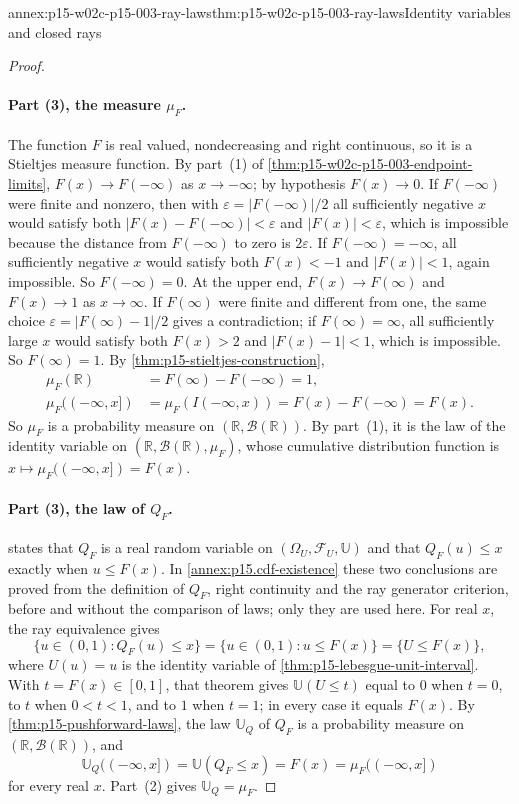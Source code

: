 \begin{annexitem}{annex:p15-w02c-p15-003-ray-laws}{thm:p15-w02c-p15-003-ray-laws}{Identity variables and closed rays}
\begin{proof}
\paragraph{Part (3), the measure \(\mu_F\).}
The function \(F\) is real valued, nondecreasing and right continuous,
so it is a Stieltjes measure function. By part~(1) of
\cref{thm:p15-w02c-p15-003-endpoint-limits}, \(F(x)\to F(-\infty)\) as
\(x\to-\infty\); by hypothesis \(F(x)\to0\). If \(F(-\infty)\) were
finite and nonzero, then with \(\varepsilon=|F(-\infty)|/2\) all
sufficiently negative \(x\) would satisfy both
\(|F(x)-F(-\infty)|<\varepsilon\) and \(|F(x)|<\varepsilon\), which
is impossible because the distance from \(F(-\infty)\) to zero is
\(2\varepsilon\). If \(F(-\infty)=-\infty\), all sufficiently negative
\(x\) would satisfy both \(F(x)<-1\) and \(|F(x)|<1\), again
impossible. So \(F(-\infty)=0\). At the upper end, \(F(x)\to F(\infty)\)
and \(F(x)\to1\) as \(x\to\infty\). If \(F(\infty)\) were finite and
different from one, the same choice
\(\varepsilon=|F(\infty)-1|/2\) gives a contradiction; if
\(F(\infty)=\infty\), all sufficiently large \(x\) would satisfy both
\(F(x)>2\) and \(|F(x)-1|<1\), which is impossible. So
\(F(\infty)=1\). By
\cref{thm:p15-stieltjes-construction},
\[
 \begin{aligned}
 \mu_F(\mathbb R)&=F(\infty)-F(-\infty)=1,\\
 \mu_F((-\infty,x])&=\mu_F(I(-\infty,x))=F(x)-F(-\infty)=F(x).
 \end{aligned}
\]
So \(\mu_F\) is a probability measure on
\((\mathbb R,\mathcal B(\mathbb R))\). By part~(1), it is the law of
the identity variable on \((\mathbb R,\mathcal B(\mathbb R),\mu_F)\),
whose cumulative distribution function is
\(x\mapsto\mu_F((-\infty,x])=F(x)\).

\paragraph{Part (3), the law of \(Q_F\).}
 states that \(Q_F\) is a real random
variable on \((\Omega_U,\mathcal F_U,\mathbb U)\) and that
\(Q_F(u)\leq x\) exactly when \(u\leq F(x)\). In
\cref{annex:p15.cdf-existence} these two conclusions are proved from the
definition of \(Q_F\), right continuity and the ray generator criterion,
before and without the comparison of laws; only they are used here. For
real \(x\), the ray equivalence gives
\[
 \{u\in(0,1):Q_F(u)\leq x\}=\{u\in(0,1):u\leq F(x)\}=\{U\leq F(x)\},
\]
where \(U(u)=u\) is the identity variable of
\cref{thm:p15-lebesgue-unit-interval}. With \(t=F(x)\in[0,1]\), that
theorem gives \(\mathbb U(U\leq t)\) equal to \(0\) when \(t=0\), to
\(t\) when \(0<t<1\), and to \(1\) when \(t=1\); in every case it equals
\(F(x)\). By \cref{thm:p15-pushforward-laws}, the law \(\mathbb U_Q\)
of \(Q_F\) is a probability measure on \((\mathbb R,\mathcal B(\mathbb R))\),
and
\[
 \mathbb U_Q((-\infty,x])=\mathbb U(Q_F\leq x)=F(x)=\mu_F((-\infty,x])
\]
for every real \(x\). Part~(2) gives \(\mathbb U_Q=\mu_F\).


\end{proof}
\end{annexitem}
